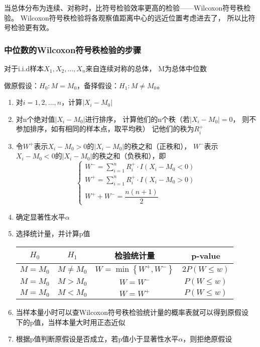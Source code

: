 \documentclass[UTF8]{ctexart}
\numberwithin{equation}{section}
\begin{document}
当总体分布为连续、对称时，比符号检验效率更高的检验——Wilcoxon符号秩检验。
Wilcoxon符号秩检验将各观察值距离中心的远近位置考虑进去了，
所以比符号检验更有效。

\subsubsection{中位数的Wilcoxon符号秩检验的步骤}

对于i.i.d样本$X_1, X_2, \dots, X_n$来自连续对称的总体，
M为总体中位数

做原假设：$H_0: M = M_0$，备择假设：$H_1: M \neq M_0$。

\begin{enumerate}
    \item 对$i = 1, 2, \dots, n$，计算$|X_i - M_0|$
    \item 对n个绝对值$|X_i - M_0|$进行排序，
    计算他们的n个秩（若$|X_i - M_0|=0$， 则不参加排序，如有相同的样本点，取平均秩）
    记他们的秩为$R_i^+$
    \item 令$W^+$表示$X_i - M_0 > 0$的$|X_i - M_0|$的秩之和（正秩和），
    $W^-$表示$X_i - M_0 < 0$的$|X_i - M_0|$的秩之和（负秩和），即
    \begin{equation}
        \begin{cases}
            W^- = \sum_{i=1}^n R_i^+ \cdot I(X_i - M_0 < 0)\\
            W^+ = \sum_{i=1}^n R_i^+ \cdot I(X_i - M_0 > 0)\\
            W^+ + W^- = \dfrac{n(n+1)}{2}
        \end{cases}
        \nonumber
    \end{equation}
    \item 确定显著性水平$\alpha$
    \item 选择统计量，并计算p值
    \begin{center}
        \begin{tabular}{cccc}
            \toprule
            $H_0$ & $H_1$ & 检验统计量 & p-value\\
            \midrule
            $M = M_0$ & $M \neq M_0$ & $W=\min{\left\{ W^+, W^-\right\}}$ & $2P(W \leq w)$\\
            $M = M_0$ & $M > M_0$ & $W=W^-$ & $P(W \leq w)$\\
            $M = M_0$ & $M < M_0$ & $W=W^+$ & $P(W \leq w)$\\
            \bottomrule
        \end{tabular}
    \end{center}
    \item 当样本量小时可以查Wilcoxon符号秩检验统计量的概率表就可以得到原假设 
    下的p值，当样本量大时用正态近似
    \item 根据p值判断原假设是否成立，若p值小于显著性水平$\alpha$，则拒绝原假设
\end{enumerate}
\end{document}
